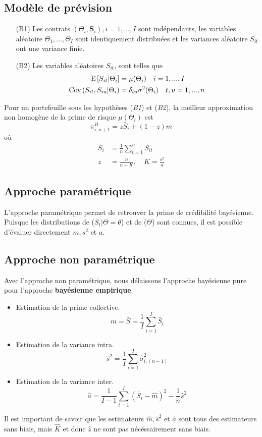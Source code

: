 \documentclass[10pt, french]{article}
\begin{document}
\begin{multicols*}{3}
\subsection*{Modèle de prévision}
\begin{itemize}
    \item[(B1)] Les contrats $(\Theta_i, \mathbf{S}_i), i = 1,...,I$ sont indépendants, les variables aléatoire $\Theta_1,...,\Theta_I$ sont identiquement distribuées et les variances aléatoire $S_{it}$ ont une variance finie.
    \item[(B2)] Les variables aléatoires $S_{it}$, sont telles que 
    \begin{align*}
        \mathrm{E} \left[ S_{it}|\Theta_i \right] &= \mu(\Theta_i)\quad i = 1,...,I \\
        \mathrm{Cov} \left( S_{it},S_{iu}|\Theta_i \right) &= \delta_{tu}\sigma^2(\Theta_i)\quad t,u = 1,...,n
    \end{align*}    
\end{itemize}
\begin{definition}
    Pour un portefeuille sous les hypothèses (\emph{B1}) et (\emph{B2}), la meilleur approximation non homogène de la prime de risque $\mu(\Theta_i)$ est
    \[ \pi_{i,n+1}^B = z\bar{S}_i + (1 - z)m \]
    où
    \begin{align*}
        \bar{S}_i &= \frac{1}{n} \sum_{t=1}^n S_{it} \\
        z &= \frac{n}{n+K},\quad K = \frac{s^2}{a}
    \end{align*}
\end{definition}

\subsection*{Approche paramétrique}
L'approche paramétrique permet de retrouver la prime de crédibilité bayésienne. Puisque les distributions de ($S_t|\Theta = \theta$) et de ($\Theta$) sont connues, il est possible d'évaluer directement $m, s^2$ et $a$.

\subsection*{Approche non paramétrique}
Avec l'approche non paramétrique, nous délaissons l'approche bayésienne pure pour l'approche \textbf{bayésienne empirique}.
\begin{itemize}
    \item Estimation de la prime collective. \[ \hat{m} = \bar{S} =  \frac{1}{I} \sum_{i=1}^I \bar{S}_i \]
    \item Estimation de la variance intra. \[ \hat{s}^2 = \frac{1}{I} \sum_{i=1}^I \hat{\sigma}_{i,(n-1)}^2 \]
    \item Estimation de la variance inter. \[ \hat{a} = \frac{1}{I-1} \sum_{i=1}^I (\bar{S}_i - \hat{m})^2 - \frac{1}{n} \hat{s}^2 \]
\end{itemize}
Il est important de savoir que les estimateurs $\hat{m}, \hat{s}^2$ et $\hat{a}$ sont tous des estimateurs sans biais, mais $\hat{K}$ et donc $\hat{z}$ ne sont pas nécéssairement sans biais.


\end{multicols*}
\end{document}
